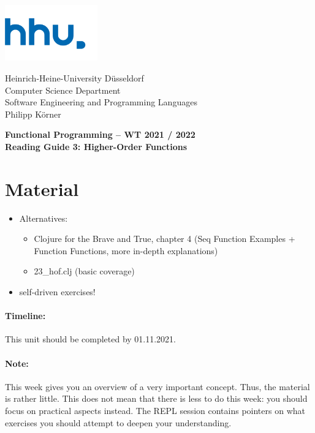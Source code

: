 \documentclass[11pt,a4paper]{article}
\begin{document}
\begin{minipage}[b]{\textwidth}
	\parbox[t]{5cm}{%
		\includegraphics[width=4cm]{unilogo}
		\hfill
	}
	\parbox[b]{11cm}{%
		Heinrich-Heine-University D\"usseldorf\\
		Computer Science Department\\
		Software Engineering and Programming Languages\\
		Philipp K\"orner
	}
\end{minipage}
\begin{center}
	\bf
	Functional Programming -- WT 2021 / 2022\\
	Reading Guide 3: Higher-Order Functions
\end{center}

\pagestyle{empty}

\section{Material} 

\begin{itemize}
    \item Alternatives:
        \begin{itemize}
            \item Clojure for the Brave and True, chapter 4 (Seq Function Examples + Function Functions, more in-depth explanations)
            \item 23\_hof.clj (basic coverage)
        \end{itemize}
    \item self-driven exercises!
\end{itemize}

\paragraph{Timeline:} This unit should be completed by 01.11.2021.

\paragraph{Note:} This week gives you an overview of a very important concept.
Thus, the material is rather little.
This does not mean that there is less to do this week: you should focus on practical aspects instead.
The REPL session contains pointers on what exercises you should attempt to deepen your understanding.
\end{document}
